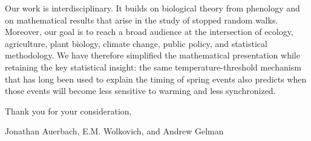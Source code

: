 \documentclass{article}
\begin{document}
Our work is interdisciplinary. It builds on biological theory from phenology and on mathematical results that arise in the study of stopped random walks. Moreover, our goal is to reach a broad audience at the intersection of ecology, agriculture, plant biology, climate change, public policy, and statistical methodology. We have therefore simplified the mathematical presentation while retaining the key statistical insight: the same temperature-threshold mechanism that has long been used to explain the timing of spring events also predicts when those events will become less sensitive to warming and less synchronized.

Thank you for your consideration,

Jonathan Auerbach, E.M. Wolkovich, and Andrew Gelman

\newpage 


\end{document}

